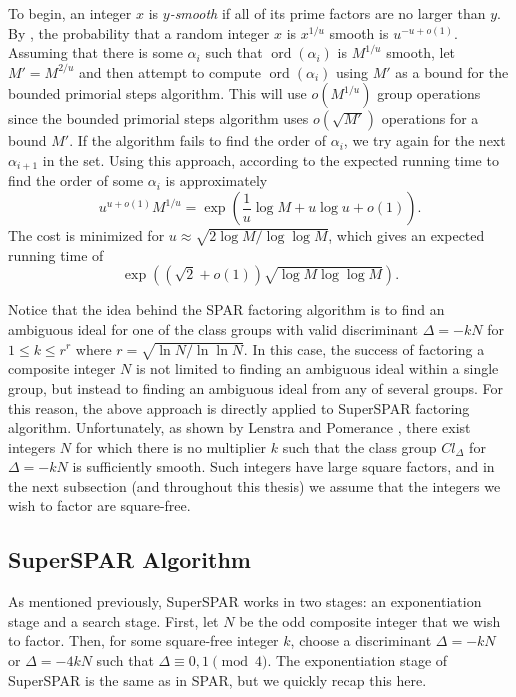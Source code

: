 \documentclass{ucalgthes1}
\theoremstyle{definition}
\DeclareMathOperator{\ord}{ord}
\begin{document}
To begin, an integer $x$ is \emph{$y$-smooth} if all of its prime factors are no larger than $y$.  By \cite[p.81]{Sutherland2007}, the probability that a random integer $x$ is $x^{1/u}$ smooth is $u^{-u+o(1)}$.  Assuming that there is some $\alpha_i$ such that $\ord(\alpha_i)$ is $M^{1/u}$ smooth, let $M'=M^{2/u}$ and then attempt to compute $\ord(\alpha_i)$ using $M'$ as a bound for the bounded primorial steps algorithm.  This will use $o(M^{1/u})$ group operations since the bounded primorial steps algorithm uses $o(\sqrt{M'})$ operations for a bound $M'$.  If the algorithm fails to find the order of $\alpha_i$, we try again for the next $\alpha_{i+1}$ in the set.  Using this approach, according to \cite[pp.81--82]{Sutherland2007} the expected running time to find the order of some $\alpha_i$ is approximately
\[
	u^{u+o(1)}M^{1/u} = \exp \left( \frac{1}{u}\log M + u \log u + o(1) \right).
\]
The cost is minimized for $u \approx \sqrt{2 \log M / \log \log M}$, which gives an expected running time of
\[
	\exp \left( \left( \sqrt2 + o(1) \right) \sqrt{\log M \log \log M} \right).
\]

Notice that the idea behind the SPAR factoring algorithm is to find an ambiguous ideal for one of the class groups with valid discriminant $\Delta = -kN$ for $1 \le k \le r^r$ where $r = \sqrt{\ln N / \ln \ln N}$.  In this case, the success of factoring a composite integer $N$ is not limited to finding an ambiguous ideal within a single group, but instead to finding an ambiguous ideal from any of several groups.  For this reason, the above approach is directly applied to SuperSPAR factoring algorithm.  Unfortunately, as shown by Lenstra and Pomerance \mbox{\cite[\S~11]{Lenstra1992}}, there exist integers $N$ for which there is no multiplier $k$ such that the class group $Cl_\Delta$ for $\Delta = -kN$ is sufficiently smooth.  Such integers have large square factors, and in the next subsection (and throughout this thesis) we assume that the integers we wish to factor are square-free.


\subsection{SuperSPAR Algorithm}
\label{subsec:ssparAlg}

As mentioned previously, SuperSPAR works in two stages: an exponentiation stage and a search stage.  First, let $N$ be the odd composite integer that we wish to factor.  Then, for some square-free integer $k$, choose a discriminant $\Delta = -kN$ or $\Delta = -4kN$ such that $\Delta \equiv 0, 1 \pmod 4$.  The exponentiation stage of SuperSPAR is the same as in SPAR, but we quickly recap this here.
\end{document}
